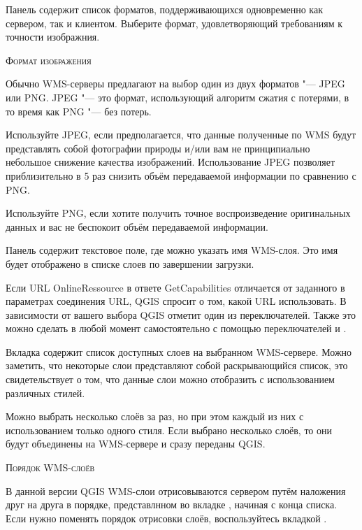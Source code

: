 
Панель  содержит список форматов,
поддерживающихся одновременно как сервером, так и клиентом.
Выберите формат, удовлетворяющий требованиям к точности изображния.

\begin{Tip}[ht]\caption{\textsc{Формат изображения}}
Обычно WMS-серверы предлагают на выбор один из двух форматов "--- JPEG или PNG.
JPEG "--- это формат, использующий алгоритм сжатия с потерями, в то время
как PNG "--- без потерь.

Используйте JPEG, если предполагается, что данные полученные по WMS
будут представлять собой фотографии природы и/или вам не принципиально
небольшое снижение качества изображений. Использование JPEG позволяет
приблизительно в 5 раз снизить объём передаваемой информации по сравнению
с PNG.

Используйте PNG, если хотите получить точное воспроизведение оригинальных
данных и вас не беспокоит объём передаваемой информации. 
\end{Tip}


Панель содержит текстовое поле, где можно указать имя
WMS-слоя. Это имя будет отображено в списке слоев по завершении загрузки.

Если URL OnlineRessource в ответе GetCapabilities отличается от заданного в
параметрах соединения URL, QGIS спросит о том, какой URL использовать.
В зависимости от вашего выбора QGIS отметит один из переключателей. Также это
можно сделать в любой момент самостоятельно с помощью переключателей
 и .

 \label{ogc-wms-layers}

Вкладка  содержит список доступных слоев на выбранном WMS-сервере.
Можно заметить, что некоторые слои представляют собой раскрывающийся список,
это свидетельствует о том, что данные слои можно отобразить с использованием
различных стилей.

Можно выбрать несколько слоёв за раз, но при этом каждый из них с
использованием только одного стиля. Если выбрано несколько слоёв, то
они будут объединены на WMS-сервере и сразу переданы QGIS.

\begin{Tip}[ht]\caption{\textsc{Порядок WMS-слоёв}}
В данной версии QGIS WMS-слои отрисовываются сервером путём наложения
друг на друга в порядке, представлнном во вкладке , начиная с конца
списка. Если нужно поменять порядок отрисовки слоёв, воспользуйтесь вкладкой
.
\end{Tip}

